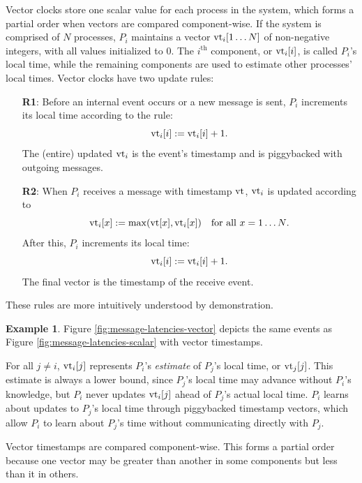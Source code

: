 \documentclass[]             %
{NASA}                       %
\theoremstyle{definition}
\newtheorem{example}[theorem]{Example}
\begin{document}
Vector clocks store one scalar value for each process in the system,
which forms a partial order when vectors are compared
component-wise. If the system is comprised of $N$ processes, $P_i$
maintains a vector $\textrm{vt}_i[1 \ldots N]$ of non-negative integers, with
all values initialized to $0$. The $i^\textrm{th}$ component, or
$\textrm{vt}_i[i]$, is called $P_i$'s local time, while the remaining
components are used to estimate other processes' local times. Vector
clocks have two update rules:
\begin{enumerate}
\item[\textbf{R1}:] Before an internal event occurs or a new message is sent, $P_i$
  increments its local time according to the rule:
  \[\textrm{vt}_i[i] := \textrm{vt}_i[i] + 1.\]
  The (entire) updated $\textrm{vt}_i$ is the event's timestamp and is piggybacked with outgoing messages.
\item[\textbf{R2}:] When $P_i$ receives a message with timestamp
  $\textrm{vt}$, $\textrm{vt}_i$ is updated according to
  \[\textrm{vt}_i[x] := \max(\textrm{vt}[x], \textrm{vt}_i[x]) \quad \textrm{for all $x = 1\ldots N$}.\]
  After this, $P_i$ increments its local time:
  \[ \textrm{vt}_i[i] := \textrm{vt}_i[i] + 1.\]
  The final vector is the timestamp of the receive event.
\end{enumerate}
These rules are more intuitively understood by demonstration.

\begin{example}
  Figure \ref{fig:message-latencies-vector} depicts the same events as
  Figure \ref{fig:message-latencies-scalar} with vector timestamps.
\end{example}

For all $j \neq i$, $\textrm{vt}_i[j]$ represents $P_i$'s \emph{estimate} of
$P_j$'s local time, or $\textrm{vt}_j[j]$. This estimate is always a lower
bound, since $P_j$'s local time may advance without $P_i$'s knowledge,
but $P_i$ never updates $\textrm{vt}_i[j]$ ahead of $P_j$'s actual local
time. $P_i$ learns about updates to $P_j$'s local time through
piggybacked timestamp vectors, which allow $P_i$ to learn about
$P_j$'s time without communicating directly with $P_j$.

Vector timestamps are compared component-wise. This forms a partial
order because one vector may be greater than another in some
components but less than it in others.
\end{document}
